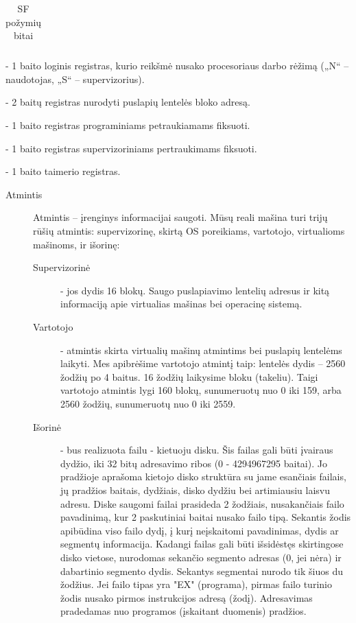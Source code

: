 \begin{description}
\begin{description}
\begin{table}[H]
\begin{tabularx}{0.85\textwidth}{|c|c|c|X|}
                \end{tabularx}
                \caption{SF požymių bitai}
            \end{table}
        \item[MODE] - 1 baito loginis registras, kurio reikšmė nusako procesoriaus darbo rėžimą („N“ – naudotojas, „S“ – supervizorius).
        \item[PLR] - 2 baitų registras nurodyti puslapių lentelės bloko adresą.
        \item[PI] - 1 baito registras programiniams petraukiamams fiksuoti.
        \item[SI] - 1 baito registras supervizoriniams pertraukimams fiksuoti.
        \item[TI] - 1 baito taimerio registras.
    \end{description}
\end{description}


\begin{description}
\item[Atmintis] Atmintis – įrenginys informacijai saugoti. Mūsų reali mašina turi trijų rūšių atmintis: supervizorinę, skirtą OS poreikiams, vartotojo, virtualioms mašinoms, ir išorinę:
    \begin{description}
        \item[Supervizorinė] - jos dydis 16 blokų. Saugo puslapiavimo lentelių adresus ir kitą informaciją apie virtualias mašinas bei operacinę sistemą.
        \item[Vartotojo] - atmintis skirta virtualių mašinų atmintims bei puslapių lentelėms laikyti. Mes apibrėšime vartotojo atmintį taip: lentelės dydis – 2560 žodžių po 4 baitus. 16 žodžių laikysime bloku (takeliu). Taigi vartotojo atmintis lygi 160 blokų, sunumeruotų nuo 0 iki 159, arba 2560 žodžių, sunumeruotų nuo 0 iki 2559.
        \item[Išorinė] - bus realizuota failu - kietuoju disku. Šis failas gali būti įvairaus dydžio, iki 32 bitų adresavimo ribos (0 - 4294967295 baitai). Jo pradžioje aprašoma kietojo disko struktūra su jame esančiais failais, jų pradžios baitais, dydžiais, disko dydžiu bei artimiausiu laisvu adresu. Diske saugomi failai prasideda 2 žodžiais, nusakančiais failo pavadinimą, kur 2 paskutiniai baitai nusako failo tipą. Sekantis žodis apibūdina viso failo dydį, į kurį neįskaitomi pavadinimas, dydis ar segmentų informacija. Kadangi failas gali būti išsidėstęs skirtingose disko vietose, nurodomas sekančio segmento adresas (0, jei nėra) ir dabartinio segmento dydis. Sekantys segmentai nurodo tik šiuos du žodžius. Jei failo tipas yra "EX" (programa), pirmas failo turinio žodis nusako pirmos instrukcijos adresą (žodį). Adresavimas pradedamas nuo programos (įskaitant duomenis) pradžios.
    \end{description}
\end{description}

